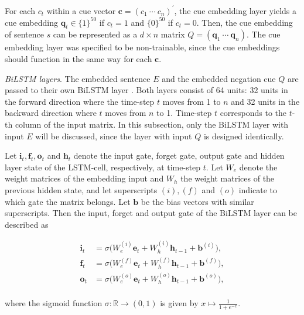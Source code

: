 \documentclass{article}
\begin{document}
\begin{multicols}{2}
For each $c_t$ within a cue vector $\mathbf{c}= (c_1~\cdots~c_{n})^{\prime}$, the cue embedding layer yields a cue embedding $\mathbf{q}_t \in \{1\}^{50}$ if $c_{t}=1$ and $\{0\}^{50}$ if $c_{t}=0$. Then, the cue embedding of sentence $s$ can be represented as a $d \times n$ matrix $Q = (\mathbf{q}_{1}~\cdots~\mathbf{q}_{n})$. The cue embedding layer was specified to be non-trainable, since the cue embeddings should function in the same way for each $\mathbf{c}$. \newline 

\textit{BiLSTM layers}.
The embedded sentence $E$ and the embedded negation cue $Q$ are passed to their own BiLSTM layer \citep{hochreiter}. Both layers consist of 64 units: 32 units in the forward direction where the time-step $t$ moves from 1 to $n$ and 32 units in the backward direction where $t$ moves from $n$ to 1. Time-step $t$ corresponds to the $t$-th column of the input matrix. In this subsection, only the BiLSTM layer with input $E$ will be discussed, since the layer with input $Q$ is designed identically. 

Let $\mathbf{i}_t, \mathbf{f}_t, \mathbf{o}_t$ and $\mathbf{h}_t$ denote the input gate, forget gate, output gate and hidden layer state of the LSTM-cell, respectively, at time-step $t$. Let $W_e$ denote the weight matrices of the embedding input and $W_h$ the weight matrices of the previous hidden state, and let superscripts $(i), (f)$ and $(o)$ indicate to which gate the matrix belongs. Let $\mathbf{b}$ be the bias vectors with similar superscripts. Then the input, forget and output gate of the BiLSTM layer can be described as 

$$
\begin{aligned}
\mathbf{i}_t &= \sigma\big(W_e^{(i)}\mathbf{e}_t + 
W_h^{(i)}\mathbf{h}_{t-1} +\mathbf{b}^{(i)} \big), \\ 
\mathbf{f}_t &= \sigma\big(W_e^{(f)}\mathbf{e}_t + 
W_h^{(f)}\mathbf{h}_{t-1} +\mathbf{b}^{(f)} \big), \\
\mathbf{o}_t &= \sigma\big(W_e^{(o)}\mathbf{e}_t + 
W_h^{(o)}\mathbf{h}_{t-1} +\mathbf{b}^{(o)} \big), \\ 
\end{aligned}
$$

where the sigmoid function $\sigma: \mathbb{R}\rightarrow(0,1)$ is given by $x \mapsto \frac{1}{1+e^{-x}}$. 


\end{multicols}
\end{document}

